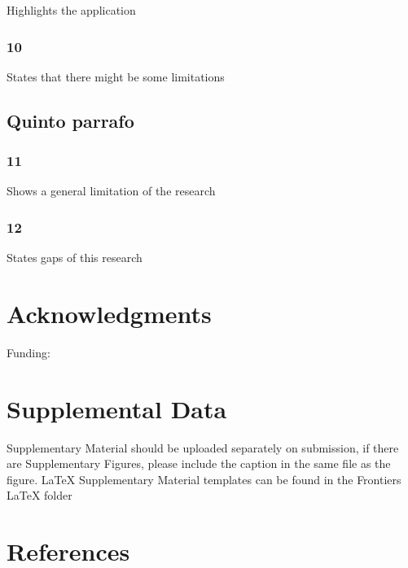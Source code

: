 \documentclass[]{article}
\begin{document}
Highlights the application

\hypertarget{section-7}{%
\subsubsection{10}\label{section-7}}

States that there might be some limitations

\hypertarget{quinto-parrafo}{%
\subsection{Quinto parrafo}\label{quinto-parrafo}}

\hypertarget{section-8}{%
\subsubsection{11}\label{section-8}}

Shows a general limitation of the research

\hypertarget{section-9}{%
\subsubsection{12}\label{section-9}}

States gaps of this research

\hypertarget{acknowledgments}{%
\section*{Acknowledgments}\label{acknowledgments}}

Funding:

\hypertarget{supplemental-data}{%
\section{Supplemental Data}\label{supplemental-data}}

Supplementary Material should be uploaded separately on submission, if there are
Supplementary Figures, please include the caption in the same file as the
figure. LaTeX Supplementary Material templates can be found in the Frontiers
LaTeX folder

\hypertarget{references}{%
\section{References}\label{references}}
\end{document}

